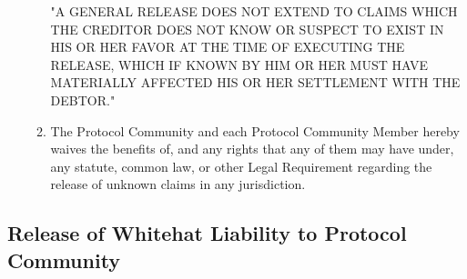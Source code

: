 \documentclass{article}
\begin{document}
\begin{enumerate}
\begin{enumerate}
                    "A GENERAL RELEASE DOES NOT EXTEND TO CLAIMS WHICH THE CREDITOR DOES NOT KNOW OR SUSPECT TO EXIST IN HIS OR HER FAVOR AT THE TIME OF EXECUTING THE RELEASE, WHICH IF KNOWN BY HIM OR HER MUST HAVE MATERIALLY AFFECTED HIS OR HER SETTLEMENT WITH THE DEBTOR."

              \item The Protocol Community and each Protocol Community Member hereby waives the benefits of, and any rights that any of them may have under, any statute, common law, or other Legal Requirement regarding the release of unknown claims in any jurisdiction.
          \end{enumerate}
\end{enumerate}

\subsection{Release of Whitehat Liability to Protocol Community}\label{subsec:release_whitehat_liability_protocol_community}
\end{document}
